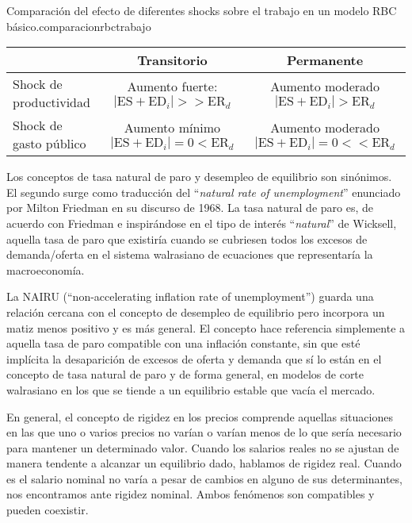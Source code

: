 \documentclass{nuevotema}
\begin{document}
\begin{tabla}{Comparación del efecto de diferentes shocks sobre el trabajo en un modelo RBC básico.}{comparacionrbctrabajo}
	\begin{tabular}{l | c | c}
					   & Transitorio & Permanente \\ \hline
Shock de productividad & Aumento fuerte: $|\text{ES}+\text{ED}_i| >> \text{ER}_d$ & Aumento moderado $|\text{ES}+\text{ED}_i| > \text{ER}_d$ \\ \hline
Shock de gasto público & Aumento mínimo $|\text{ES}+\text{ED}_i| = 0 < \text{ER}_d$ & Aumento moderado $|\text{ES}+\text{ED}_i| = 0 << \text{ER}_d$ \\ \hline
	\end{tabular}
\end{tabla}
\conceptos


Los conceptos de tasa natural de paro y desempleo de equilibrio son sinónimos. El segundo surge como traducción del ``\textit{natural rate of unemployment}'' enunciado por Milton Friedman en su discurso de 1968. La tasa natural de paro es, de acuerdo con Friedman e inspirándose en el tipo de interés ``\textit{natural}'' de Wicksell, aquella tasa de paro que existiría cuando se cubriesen todos los excesos de demanda/oferta en el sistema walrasiano de ecuaciones que representaría la macroeconomía. 

La NAIRU (``non-accelerating inflation rate of unemployment'') guarda una relación cercana con el concepto de desempleo de equilibrio pero incorpora un matiz menos positivo y es más general. El concepto hace referencia simplemente a aquella tasa de paro compatible con una inflación constante, sin que esté implícita la desaparición de excesos de oferta y demanda que sí lo están en el concepto de tasa natural de paro y de forma general, en modelos de corte walrasiano en los que se tiende a un equilibrio estable que vacía el mercado.


En general, el concepto de rigidez en los precios comprende aquellas situaciones en las que uno o varios precios no varían o varían menos de lo que sería necesario para mantener un determinado valor. Cuando los salarios reales no se ajustan de manera tendente a alcanzar un equilibrio dado, hablamos de rigidez real. Cuando es el salario nominal no varía a pesar de cambios en alguno de sus determinantes, nos encontramos ante rigidez nominal. Ambos fenómenos son compatibles y pueden coexistir. 
\end{document}
